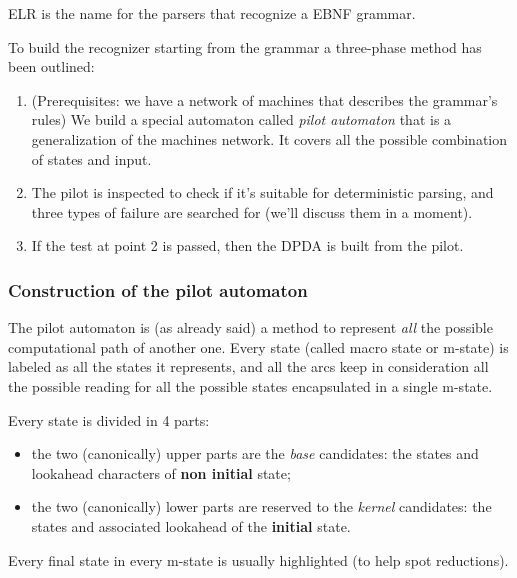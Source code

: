 			ELR is the name for the parsers that recognize a EBNF grammar.

			To build the recognizer starting from the grammar a three-phase method has been outlined:
			\begin{enumerate}
				\item (Prerequisites: we have a network of machines that describes the grammar's rules) We build a special automaton called \emph{pilot automaton} 
				that is a generalization of the machines network. It covers all the possible combination of states and input.
				\item The pilot is inspected to check if it's suitable for deterministic parsing, and three types of failure are searched for (we'll discuss them 
				in a moment).
				\item If the test at point 2 is passed, then the DPDA is built from the pilot. 
			\end{enumerate}
			
			\subsubsection{Construction of the pilot automaton}
				The pilot automaton is (as already said) a method to represent \emph{all} the possible computational path of another one. Every state (called macro 
				state or m-state) is labeled as all the states it represents, and all the arcs keep in consideration all the possible reading for all the possible 
				states encapsulated in a single m-state.

				Every state is divided in 4 parts:
				\begin{itemize}
					\item the two (canonically) upper parts are the \emph{base} candidates: the states and lookahead characters of \textbf{non initial} state;
					\item the two (canonically) lower parts are reserved to the \emph{kernel} candidates: the states and associated lookahead of the 
					\textbf{initial} state.
				\end{itemize}
				Every final state in every m-state is usually highlighted (to help spot reductions).

